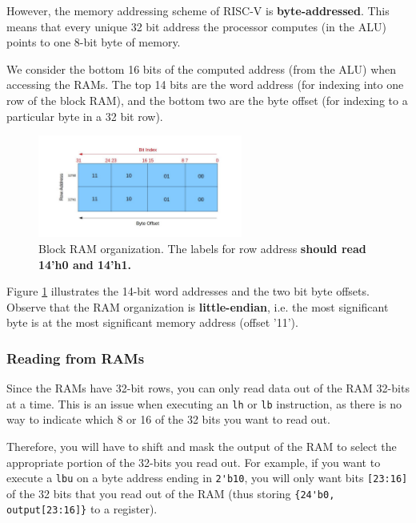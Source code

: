 \documentclass[11pt]{article}
\begin{document}
However, the memory addressing scheme of RISC-V is \textbf{byte-addressed}.
This means that every unique 32 bit address the processor computes (in the ALU) points to one 8-bit byte of memory.

We consider the bottom 16 bits of the computed address (from the ALU) when accessing the RAMs.
The top 14 bits are the word address (for indexing into one row of the block RAM), and the bottom two are the byte offset (for indexing to a particular byte in a 32 bit row).

\label{endianness}
\begin{figure}[H]
  \begin{center}
    \includegraphics[width=0.6\textwidth]{endianness_img}
    \caption{Block RAM organization. The labels for row address \textbf{should read 14'h0 and 14'h1.}}
    \label{fig:endianness_img}
  \end{center}
\end{figure}

Figure \ref{fig:endianness_img} illustrates the 14-bit word addresses and the two bit byte offsets.
Observe that the RAM organization is \textbf{little-endian}, i.e. the most significant byte is at the most significant memory address (offset '11').

\subsubsection{Reading from RAMs}
Since the RAMs have 32-bit rows, you can only read data out of the RAM 32-bits at a time.
This is an issue when executing an \verb|lh| or \verb|lb| instruction, as there is no way to indicate which 8 or 16 of the 32 bits you want to read out.

Therefore, you will have to shift and mask the output of the RAM to select the appropriate portion of the 32-bits you read out.
For example, if you want to execute a \verb|lbu| on a byte address ending in \verb|2'b10|, you will only want bits \verb|[23:16]| of the 32 bits that you read out of the RAM (thus storing \verb|{24'b0, output[23:16]}| to a register).
\end{document}
